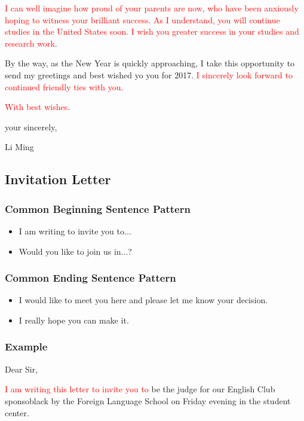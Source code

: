 \documentclass{article}
\begin{document}
\par \textcolor{red}{I can well imagine how proud of your parents are now, who have been
  anxiously hoping to witness your brilliant success. As I understand, you will continue
  studies in the United States soon. I wish you greater success in your studies and
  research work}.

\par By the way, as the New Year is quickly approaching, I take this opportunity to send my
greetings and best wished yo you for 2017. \textcolor{red}{I sincerely look forward to
  continued friendly ties with you}.

\par \textcolor{red}{With best wishes}.

\hfill your sincerely,

\hfill Li Ming 


\subsection{Invitation Letter}
\label{sec:letter}

\subsubsection{Common Beginning Sentence Pattern}
\label{sec:comm-begnn-sent}
\begin{itemize}
\item I am writing to invite you to...
\item Would you like to join us in...?
\end{itemize}

\subsubsection{Common Ending Sentence Pattern}
\label{sec:comm-ending-sent-2}
\begin{itemize}
\item I would like to meet you here and please let me know your decision.
\item I really hope you can make it.
\end{itemize}

\subsubsection{Example}
\label{sec:example-2}
Dear Sir,
\par \textcolor{red}{I am writing this letter to invite you to }be the judge for our
English Club sponsoblack by the Foreign Language School on Friday evening in the student
center.
\end{document}
